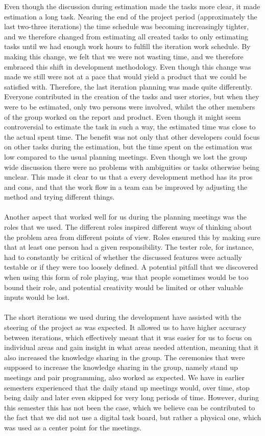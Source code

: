 Even though the discussion during estimation made the tasks more clear, it made estimation a long task. Nearing the end of the project period (approximately the last two-three iterations) the time schedule was becoming increasingly tighter, and we therefore changed from estimating all created tasks to only estimating tasks until we had enough work hours to fulfill the iteration work schedule. By making this change, we felt that we were not wasting time, and we therefore embraced this shift in development methodology. Even though this change was made we still were not at a pace that would yield a product that we could be satisfied with. Therefore, the last iteration planning was made quite differently. Everyone contributed in the creation of the tasks and user stories, but when they were to be estimated, only two persons were involved, whilst the other members of the group worked on the report and product. Even though it might seem controversial to estimate the task in such a way, the estimated time was close to the actual spent time. The benefit was not only that other developers could focus on other tasks during the estimation, but the time spent on the estimation was low compared to the usual planning meetings. Even though we lost the group wide discussion there were no problems with ambiguities or tasks otherwise being unclear. This made it clear to us that a every development method has its pros and cons, and that the work flow in a team can be improved by adjusting the method and trying different things. 
\\\\
Another aspect that worked well for us during the planning meetings was the roles that we used. The different roles inspired different ways of thinking about the problem area from different points of view. Roles ensured this by making sure that at least one person had a given responsibility. The tester role, for instance, had to constantly be critical of whether the discussed features were actually testable or if they were too loosely defined. 
A potential pitfall that we discovered when using this form of role playing, was that people sometimes would be too bound their role, and potential creativity would be limited or other valuable inputs would be lost.
\\\\
The short iterations we used during the development have assisted with the steering of the project as was expected. It allowed us to have higher accuracy between iterations, which effectively meant that it was easier for us to focus on individual areas and gain insight in what areas needed attention, meaning that it also increased the knowledge sharing in the group. The  ceremonies that were supposed to increase the knowledge sharing in the group, namely stand up meetings and pair programming, also worked as expected. We have in earlier semesters experienced that the daily stand up meetings would, over time, stop being daily and later even skipped for very long periods of time. However, during this semester this has not been the case, which we believe can be contributed to the fact that we did not use a digital task board, but rather a physical one, which was used as a center point for the meetings. 
